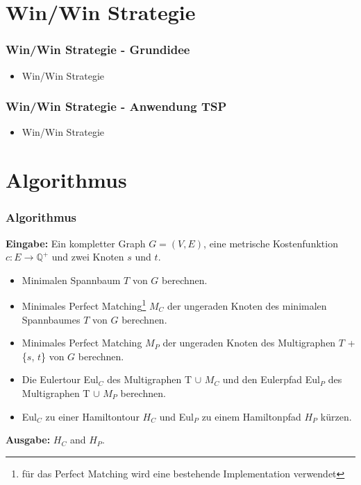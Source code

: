 \documentclass[12pt]{beamer}
\begin{document}
    \section{Win/Win Strategie}
    \begin{frame}
        \frametitle{Win/Win Strategie - Grundidee}
	    \begin{itemize}
                \item Win/Win Strategie
            \end{itemize}
    \end{frame}
    \begin{frame}
        \frametitle{Win/Win Strategie - Anwendung TSP}
	    \begin{itemize}
                \item Win/Win Strategie
            \end{itemize}
    \end{frame}
    \section{Algorithmus}
    \begin{frame}
    \frametitle{Algorithmus}
        \begin{scriptsize}
        \textbf{Eingabe:} Ein kompletter Graph $G = (V,E)$, eine metrische Kostenfunktion $c: E \rightarrow \mathbb{Q}^+$ und zwei Knoten $s$ und $t$.

        \begin{itemize}
            \item[1.] Minimalen Spannbaum $T$ von $G$ berechnen.
            \item[2.] Minimales Perfect Matching\footnote{für das Perfect Matching wird eine bestehende Implementation verwendet} $M_C$ der ungeraden Knoten des minimalen Spannbaumes $T$ von $G$ berechnen.
            \item[3.] Minimales Perfect Matching $M_P$ der ungeraden Knoten des Multigraphen $T$ + \{$s$, $t$\} von $G$ berechnen.
            \item[4.] Die Eulertour Eul$_C$ des Multigraphen T $\cup$ $M_C$ und den Eulerpfad Eul$_P$ des Multigraphen T $\cup$ $M_P$ berechnen.
            \item[6.] Eul$_C$ zu einer Hamiltontour $H_C$ und Eul$_P$ zu einem Hamiltonpfad $H_P$ kürzen.
        \end{itemize}
        \textbf{Ausgabe:} $H_C$ and $H_P$.
        \end{scriptsize}
    \end{frame}
\end{document}
